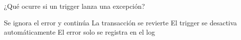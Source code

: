 \question[1] ¿Qué ocurre si un trigger lanza una excepción?
\begin{choices}
\choice Se ignora el error y continúa
\CorrectChoice La transacción se revierte
\choice El trigger se desactiva automáticamente
\choice El error solo se registra en el log
\end{choices}